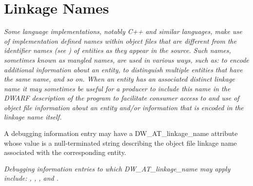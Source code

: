 \section{Linkage Names}
\label{chap:linkagenames}
\textit{Some language implementations, notably C++ and similar
languages, make use of implementation defined names within
object files that are different from the identifier names
(see ) of entities as they appear in the
source. Such names, sometimes known as mangled names,
are used in various ways, such as: to encode additional
information about an entity, to distinguish multiple entities
that have the same name, and so on. When an entity has an
associated distinct linkage name it may sometimes be useful
for a producer to include this name in the DWARF description
of the program to facilitate consumer access to and use of
object file information about an entity and/or information
that is encoded in the linkage name itself.  
}

A debugging
information entry may have a DW\-\_AT\-\_linkage\-\_name attribute
whose value is a null-terminated string describing the object
file linkage name associated with the corresponding entity.

\textit{Debugging information entries to which DW\-\_AT\-\_linkage\-\_name
may apply include: , ,
,  
and .
}
